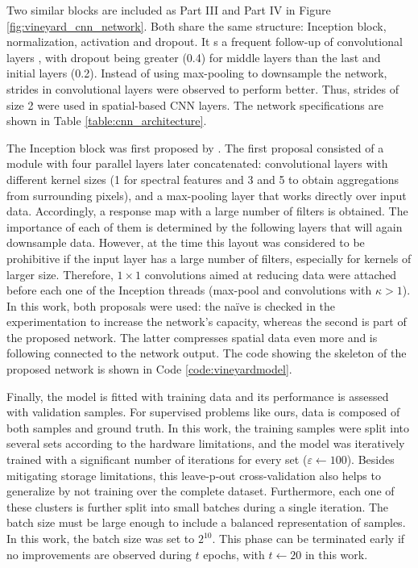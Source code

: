 Two similar blocks are included as Part III and Part IV in Figure \ref{fig:vineyard_cnn_network}. Both share the same structure: Inception block, normalization, activation and dropout. It s a frequent follow-up of convolutional layers \cite{li_faster_2022, xue_attention-based_2021}, with dropout being greater (0.4) for middle layers than the last and initial layers (0.2). Instead of using max-pooling to downsample the network, strides in convolutional layers were observed to perform better. Thus, strides of size 2 were used in spatial-based CNN layers. The network specifications are shown in Table \ref{table:cnn_architecture}.

The Inception block was first proposed by \cite{szegedy_going_2014}. The first proposal consisted of a module with four parallel layers later concatenated: convolutional layers with different kernel sizes (1 for spectral features and 3 and 5 to obtain aggregations from surrounding pixels), and a max-pooling layer that works directly over input data. Accordingly, a response map with a large number of filters is obtained. The importance of each of them is determined by the following layers that will again downsample data. However, at the time this layout was considered to be prohibitive if the input layer has a large number of filters, especially for kernels of larger size. Therefore, $1\times1$ convolutions aimed at reducing data were attached before each one of the Inception threads (max-pool and convolutions with $\kappa > 1$). In this work, both proposals were used: the naïve is checked in the experimentation to increase the network's capacity, whereas the second is part of the proposed network. The latter compresses spatial data even more and is following connected to the network output. The code showing the skeleton of the proposed network is shown in Code \ref{code:vineyardmodel}.



Finally, the model is fitted with training data and its performance is assessed with validation samples. For supervised problems like ours, data is composed of both samples and ground truth. In this work, the training samples were split into several sets according to the hardware limitations, and the model was iteratively trained with a significant number of iterations for every set ($\varepsilon \gets 100$). Besides mitigating storage limitations, this leave-p-out cross-validation also helps to generalize by not training over the complete dataset. Furthermore, each one of these clusters is further split into small batches during a single iteration. The batch size must be large enough to include a balanced representation of samples. In this work, the batch size was set to $2^{10}$. This phase can be terminated early if no improvements are observed during $t$ epochs, with $t \gets 20$ in this work.

